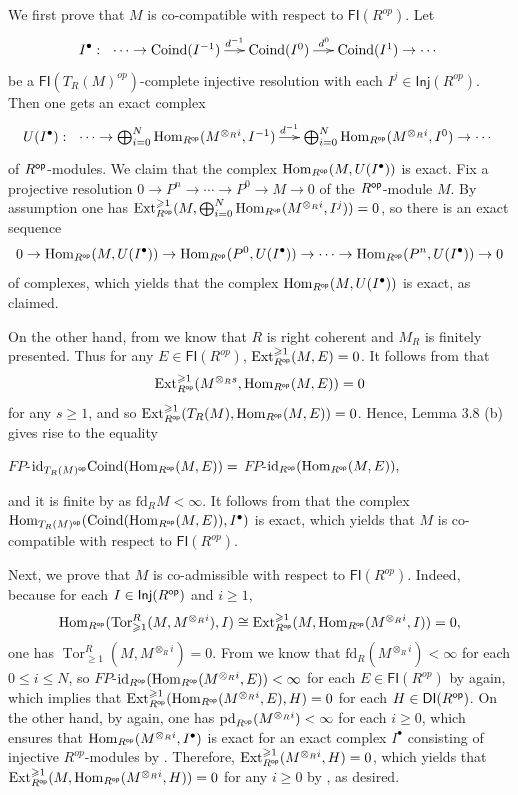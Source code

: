 \documentclass[10pt,twoside]{amsart}
\theoremstyle{bfupright head,slanted body}
\theoremstyle{bfupright head,upright body}
\theoremstyle{fixed bf head,slanted body}
\theoremstyle{fixed bf head,upright body}
\theoremstyle{numbered paragraph}
\newenvironment{prf*}[1][Proof]{%
  \begin{proof}[\bf #1]
    \setcounter{equation}{0}
    \renewcommand{\theequation}{\arabic{equation}}}
  {\end{proof}
}
\numberwithin{equation}{res}
\newcommand{\DI}{\mathsf{DI}}
\newcommand{\id}{\mathrm{id}}
\newcommand{\fd}{\mathrm{fd}}
\newcommand{\pd}{\mathrm{pd}}
\newcommand{\Inj}{\mathsf{Inj}}
\newcommand{\FI}{\mathsf{FI}}
\newcommand{\Coind}{\mathrm{Coind}}
\newcommand{\Rop}{R^{\sf op}}
\newcommand{\op}{\sf op}
\newcommand{\Hom}{\operatorname{Hom}}
\newcommand{\Ext}{\operatorname{Ext}}
\newcommand{\Tor}{\operatorname{Tor}}
\newcommand{\is}{\cong}
\begin{document}
\begin{prf*}
We first prove that $M$ is co-compatible with respect to $\FI(R^{op})$. Let
$$I^\bullet:\ \xymatrix@C=0.5cm{
\cdots \to \Coind(I^{-1}) \ar[r]^{\quad \,\,\,\,\, d^{-1}} & \Coind(I^0)
\ar[r]^{d^0 \quad \,\,} & \Coind(I^1) \to \cdots}$$
be a $\FI(T_R(M)^{op})$-complete injective resolution with each $I^{j}\in\Inj(R^{op})$. Then one gets an exact complex
$$U(I^\bullet):\ \xymatrix@C=0.5cm{ \cdots \to \bigoplus_{i=0}^N\Hom_{R^{\op}}(M^{\otimes_Ri},I^{-1})
\ar[r]^{\,\, d^{-1}} & \bigoplus_{i=0}^N\Hom_{R^{\op}}(M^{\otimes_Ri},I^{0}) \to \cdots}$$
of $\Rop$-modules.  We claim that the complex $\Hom_{\Rop}(M, U(I^\bullet))$ is exact. Fix a projective resolution $0 \to P^n \to \cdots \to  P^0 \to M \to 0$ of the $\Rop$-module $M$. By assumption one has $\Ext^{\geqslant 1}_{\Rop}(M,\bigoplus_{i=0}^N\Hom_{\Rop}(M^{\otimes_Ri}, I^{j}))=0$, so there is an exact sequence
$$0 \to \Hom_{\Rop}(M, U(I^\bullet)) \to \Hom_{\Rop}(P^0, U(I^\bullet))
\to \cdots \to \Hom_{\Rop}(P^n, U(I^\bullet)) \to 0$$
of complexes, which yields that the complex $\Hom_{\Rop}(M, U(I^\bullet))$ is exact, as claimed.

On the other hand, from \cite[Theorem 3.5]{DL} we know that $R$ is right coherent and $M_{R}$ is finitely presented. 
Thus for any $E\in\FI(R^{op})$, $\Ext_{\Rop}^{\geqslant 1}(M, E)=0$.
It follows from \cite[Lemma 2.15 (ii)]{DL} that
$$\Ext_{\Rop}^{\geqslant 1}(M^{\otimes_Rs},\Hom_{\Rop}(M,E))=0$$
for any $s\geqslant 1$, and so $\Ext_{\Rop}^{\geqslant 1}(T_R(M),\Hom_{\Rop}(M,E))=0$. 
Hence, Lemma 3.8 (b) gives rise to the equality
\begin{center}
$FP$-$\id_{T_R(M)^{\op}}\Coind(\Hom_{\Rop}(M,E))=$ $FP$-$\id_{\Rop}(\Hom_{\Rop}(M, E)),$
\end{center}
and it is finite by \cite[Lemma 4.2]{2022Mao} as $\fd_{R}M<\infty$.
It follows from \cite[Lemma 4.1]{2022Mao} that the complex 
$\Hom_{T_R(M)^{\op}}(\Coind(\Hom_{\Rop}(M,E)), I^\bullet)$ is exact, 
which yields that $M$ is co-compatible  with respect to $\FI(R^{op})$.

Next, we prove that $M$ is co-admissible  with respect to $\FI(R^{op})$.
Indeed, because for each $I \in \Inj(\Rop)$ and $i\geqslant 1$, 
$$\Hom_{\Rop}(\Tor_{\geqslant 1}^R(M, M^{\otimes_Ri}), I)\is\Ext^{\geqslant 1}_{\Rop}(M,\Hom_{\Rop}(M^{\otimes_Ri}, I))=0,$$
one has $\Tor_{\geqslant 1}^R(M, M^{\otimes_Ri})=0$. 
From \cite[Lemma 2.5]{DL} we know that $\fd_{R}(M^{\otimes_Ri})<\infty$ for each $0\leqslant i \leqslant N$, 
so $FP$-$\id_{\Rop}(\Hom_{\Rop}(M^{\otimes_Ri}, E))<\infty$
for each $E\in\FI(R^{op})$ by \cite[Lemma 4.2]{2022Mao} again,
which implies that $\Ext_{\Rop}^{\geqslant 1}(\Hom_{\Rop}(M^{\otimes_Ri}, E),H)=0$
for each $H \in \DI(\Rop)$. On the other hand,
by \cite[Lemma 2.5]{DL} again, one has $\pd_{\Rop}(M^{\otimes_Ri})<\infty$ for each $i\geqslant 0$,
which ensures that $\Hom_{\Rop}(M^{\otimes_Ri}, I^\bullet)$ is exact for an exact complex $I^\bullet$ 
consisting of injective $R^{op}$-modules by \cite[Lemma 2.5]{EIT}.
Therefore, $\Ext_{\Rop}^{\geqslant 1}(M^{\otimes_Ri}, H)=0$, which yields that
$\Ext^{\geqslant 1}_{\Rop}(M,\Hom_{\Rop}(M^{\otimes_Ri},H))=0$ for any $i\geqslant 0$
by \cite[Lemma 2.15 (i)]{DL}, as desired.
\end{prf*}
\end{document}
